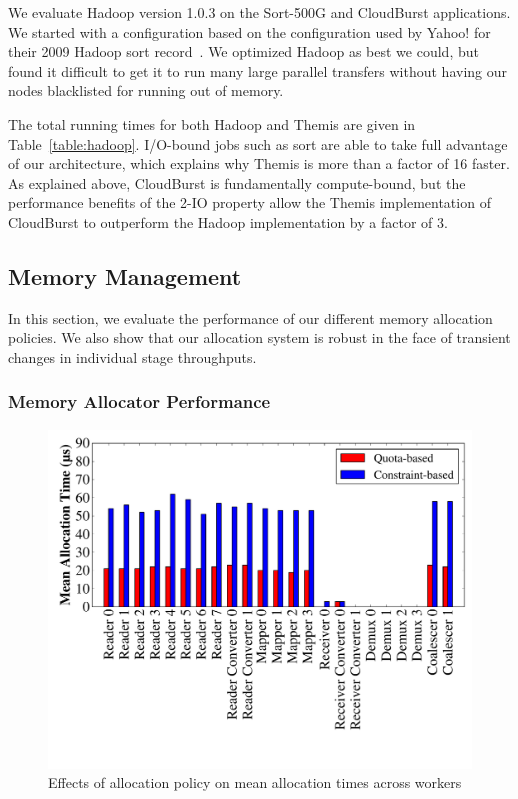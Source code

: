 We evaluate Hadoop version 1.0.3 on the Sort-500G and CloudBurst
applications. We started with a configuration based on the configuration used
by Yahoo! for their 2009 Hadoop sort record~\cite{terasort}. We optimized
Hadoop as best we could, but found it difficult to get it to run many large
parallel transfers without having our nodes blacklisted for running out of
memory.

The total running times for both Hadoop and Themis are given in
Table~\ref{table:hadoop}. I/O-bound jobs such as sort are able to take full
advantage of our architecture, which explains why Themis is more than a factor
of 16 faster. As explained above, CloudBurst is fundamentally compute-bound,
but the performance benefits of the 2-IO property allow the Themis
implementation of CloudBurst to outperform the Hadoop implementation by a
factor of 3.

\subsection{Memory Management}

In this section, we evaluate the performance of our different memory allocation
policies. We also show that our allocation system is robust in the face of
transient changes in individual stage throughputs.

\subsubsection{Memory Allocator Performance}

\begin{figure}
\includegraphics[width=\columnwidth]{themis/graphs/allocation_time_means.pdf}
\caption{\label{fig:allocation_time_means} Effects of allocation policy on mean
allocation times across workers}
\end{figure}

